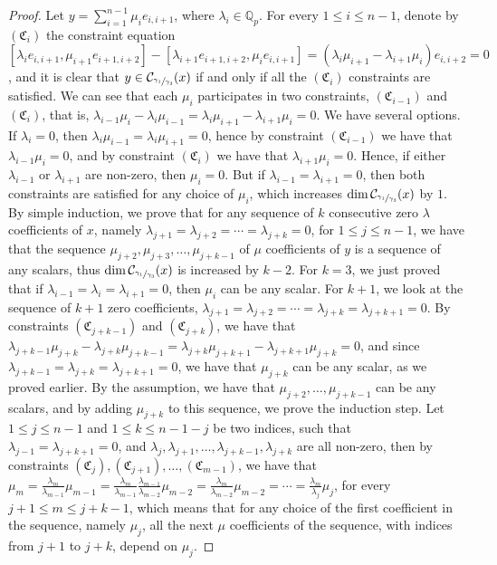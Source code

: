 \documentclass[12pt]{article}
\begin{document}
\begin{proof}
Let $y=\sum_{i=1}^{n-1}\mu_i e_{i,i+1}$, where $\lambda_i\in\mathbb{Q}_p$.
For every $1\leq i\leq n-1$, denote by $(\mathfrak{C}_i)$ the constraint equation $[\lambda_i e_{i,i+1},\mu_{i+1}e_{i+1,i+2}]-[\lambda_{i+1}e_{i+1,i+2},\mu_i e_{i,i+1}]=(\lambda_i\mu_{i+1}-\lambda_{i+1}\mu_i)e_{i,i+2}=0$, and it is clear that $y\in\mathcal{C}_{\sfrac{\gamma_1}{\gamma_3}}(x)$ if and only if all the $(\mathfrak{C}_i)$ constraints are satisfied. We can see that each $\mu_i$ participates in two constraints, $(\mathfrak{C}_{i-1})$ and $(\mathfrak{C}_i)$, that is, $\lambda_{i-1}\mu_i-\lambda_i\mu_{i-1}=\lambda_i\mu_{i+1}-\lambda_{i+1}\mu_i=0$. We have several options. If $\lambda_i=0$, then $\lambda_i\mu_{i-1}=\lambda_i\mu_{i+1}=0$, hence by constraint $(\mathfrak{C}_{i-1})$ we have that $\lambda_{i-1}\mu_i=0$, and by constraint $(\mathfrak{C}_i)$ we have that $\lambda_{i+1}\mu_i=0$. Hence, if either $\lambda_{i-1}$ or $\lambda_{i+1}$ are non-zero, then $\mu_i=0$. But if $\lambda_{i-1}=\lambda_{i+1}=0$, then both constraints are satisfied for any choice of $\mu_i$, which increases $\dim\mathcal{C}_{\sfrac{\gamma_1}{\gamma_3}}(x)$ by $1$. By simple induction, we prove that for any sequence of $k$ consecutive zero $\lambda$ coefficients of $x$, namely $\lambda_{j+1}=\lambda_{j+2}=\cdots=\lambda_{j+k}=0$, for $1\leq j\leq n-1$, we have that the sequence $\mu_{j+2},\mu_{j+3},\dots,\mu_{j+k-1}$ of $\mu$ coefficients of $y$ is a sequence of any scalars, thus $\dim\mathcal{C}_{\sfrac{\gamma_1}{\gamma_3}}(x)$ is increased by $k-2$. For $k=3$, we just proved that if $\lambda_{i-1}=\lambda_i=\lambda_{i+1}=0$, then $\mu_i$ can be any scalar. For $k+1$, we look at the sequence of $k+1$ zero coefficients, $\lambda_{j+1}=\lambda_{j+2}=\cdots=\lambda_{j+k}=\lambda_{j+k+1}=0$. By constraints $(\mathfrak{C}_{j+k-1})$ and $(\mathfrak{C}_{j+k})$, we have that $\lambda_{j+k-1}\mu_{j+k}-\lambda_{j+k}\mu_{j+k-1}=\lambda_{j+k}\mu_{j+k+1}-\lambda_{j+k+1}\mu_{j+k}=0$, and since $\lambda_{j+k-1}=\lambda_{j+k}=\lambda_{j+k+1}=0$, we have that $\mu_{j+k}$ can be any scalar, as we proved earlier. By the assumption, we have that $\mu_{j+2},\dots,\mu_{j+k-1}$ can be any scalars, and by adding $\mu_{j+k}$ to this sequence, we prove the induction step. Let $1\leq j\leq n-1$ and $1\leq k\leq n-1-j$ be two indices, such that $\lambda_{j-1}=\lambda_{j+k+1}=0$, and $\lambda_j,\lambda_{j+1},\dots,\lambda_{j+k-1},\lambda_{j+k}$ are all non-zero, then by constraints $(\mathfrak{C}_j),(\mathfrak{C}_{j+1}),\dots,(\mathfrak{C}_{m-1})$, we have that $\mu_m=\frac{\lambda_m}{\lambda_{m-1}}\mu_{m-1}=\frac{\lambda_m}{\lambda_{m-1}}\frac{\lambda_{m-1}}{\lambda_{m-2}}\mu_{m-2}=\frac{\lambda_m}{\lambda_{m-2}}\mu_{m-2}=\cdots=\frac{\lambda_m}{\lambda_j}\mu_j$, for every $j+1\leq m\leq j+k-1$, which means that for any choice of the first coefficient in the sequence, namely $\mu_j$, all the next $\mu$ coefficients of the sequence, with indices from $j+1$ to $j+k$, depend on $\mu_j$.
\end{proof}
\end{document}

